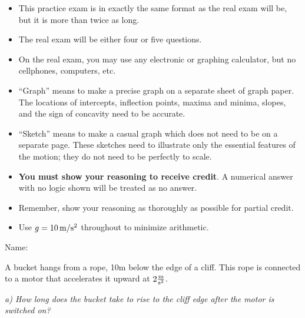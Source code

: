 \documentclass[12pt]{article}
\begin{document}
\bigskip
\bigskip
\bigskip
\bigskip

\Large \centerline{}


\vspace{2in}

\normalsize

\vspace{1.4in}

\begin{itemize}
\item{This practice exam is in exactly the same format as the real exam will be, but it is more than twice as long.}
\item{The real exam will be either four or five questions.}
\item{On the real exam, you may use any electronic or graphing calculator, but no cellphones, computers, etc.}
  \item{``Graph'' means to make a precise graph on a separate sheet of graph paper. The locations of intercepts, inflection points, maxima and minima, slopes, and the sign of concavity need to be accurate.}
  \item{``Sketch'' means to make a casual graph which does not need to be on a separate page. These sketches need to illustrate only the essential features of the motion; they do not
    need to be perfectly to scale.}
  \item{{\bf You must show your reasoning to receive credit}. A numerical answer with no logic shown will be treated as no answer.}
  \item{Remember, show your reasoning as thoroughly as possible for partial credit.}
  \item{Use $g=10\, \rm m/\rm s^2$ throughout to minimize arithmetic.}
\end{itemize}
\newpage
\small

\begin{flushright}
  Name: \underline{\hspace{3in}}
\end{flushright}



\Large \centerline{}
\normalsize

A bucket hangs from a rope, 10m below the edge of a cliff. This rope is connected to a motor that accelerates it upward at $2 \frac{\rm m}{\rm s^2}$.

\it{a) How long does the bucket take to rise to the cliff edge after the motor is switched on?}

\vspace{1in}
\end{document}
